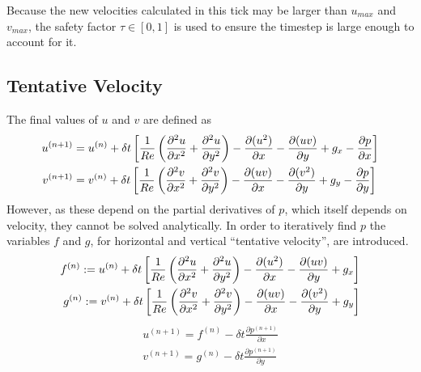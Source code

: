 Because the new velocities calculated in this tick may be larger than $u_{max}$ and $v_{max}$, the safety factor $\tau \in [0, 1]$ is used to ensure the timestep is large enough to account for it\cite{TOME1994171}.

\subsection{Tentative Velocity}
The final values of $u$ and $v$ are defined as
\begin{equation}
\begin{aligned}
    u^{(n+1)} &= u^{(n)} + \delta{t}
    \left[
        \frac{1}{Re}
        \left(\frac{\partial{^2u}}{\partial{x^2}} + \frac{\partial{^2u}}{\partial{y^2}}\right) - \frac{\partial{(u^2)}}{\partial{x}} - \frac{\partial{(uv)}}{\partial{y}} + g_x - \frac{\partial{p}}{\partial{x}}
    \right] \\
    v^{(n+1)} &= v^{(n)} + \delta{t}
    \left[
        \frac{1}{Re}
        \left(\frac{\partial{^2v}}{\partial{x^2}} + \frac{\partial{^2v}}{\partial{y^2}}\right) - \frac{\partial{(uv)}}{\partial{x}} - \frac{\partial{(v^2)}}{\partial{y}} + g_y - \frac{\partial{p}}{\partial{y}}
    \right]
\end{aligned}
\end{equation}
However, as these depend on the partial derivatives of $p$, which itself depends on velocity, they cannot be solved analytically.
In order to iteratively find $p$ the variables $f$ and $g$, for horizontal and vertical ``tentative velocity'', are introduced.
\begin{equation}
\begin{aligned}
    f^{(n)} := u^{(n)} + \delta{t}
    \left[
        \frac{1}{Re}
        \left(\frac{\partial{^2u}}{\partial{x^2}} + \frac{\partial{^2u}}{\partial{y^2}}\right) - \frac{\partial{(u^2)}}{\partial{x}} - \frac{\partial{(uv)}}{\partial{y}} + g_x
    \right] \\
    g^{(n)} := v^{(n)} + \delta{t}
    \left[
        \frac{1}{Re}
        \left(\frac{\partial{^2v}}{\partial{x^2}} + \frac{\partial{^2v}}{\partial{y^2}}\right) - \frac{\partial{(uv)}}{\partial{x}} - \frac{\partial{(v^2)}}{\partial{y}} + g_y
    \right]
\end{aligned}
\end{equation}
\begin{equation}
\begin{aligned}
    u^{(n+1)} = f^{(n)} - \delta{t}\frac{\partial{p^{(n+1)}}}{\partial{x}} \\
    v^{(n+1)} = g^{(n)} - \delta{t}\frac{\partial{p^{(n+1)}}}{\partial{y}}
    \label{eq:uv_modified}
\end{aligned}
\end{equation}

